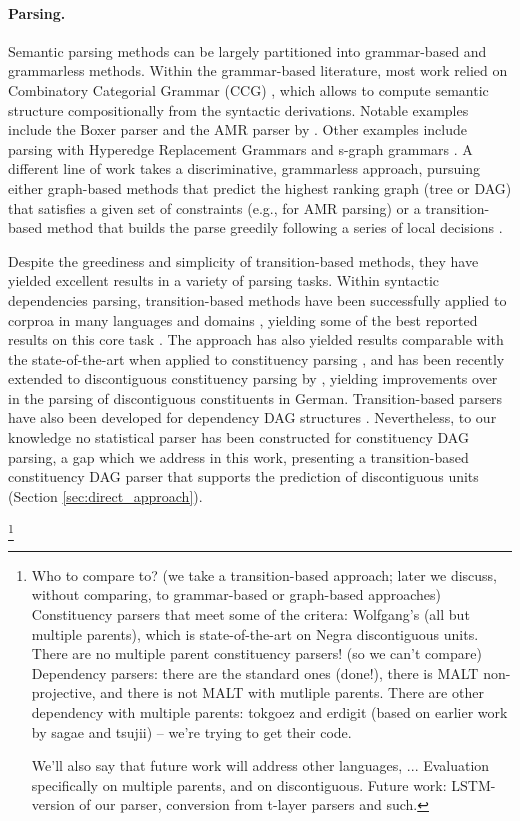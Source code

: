 \documentclass[11pt]{article}
\newcommand{\oa}[1]{\footnote{\color{red} #1}}
\newcommand{\secref}[1]{Section \ref{#1}}
\begin{document}
\paragraph{Parsing.}
Semantic parsing methods can be largely partitioned into grammar-based and grammarless methods.
Within the grammar-based literature, most work relied on Combinatory Categorial Grammar (CCG)
\cite{Steedman:00}, which allows to compute semantic structure compositionally from the
syntactic derivations. Notable examples include the Boxer parser \cite{boxer} and the AMR parser 
by . Other examples include parsing with Hyperedge Replacement Grammars
\cite{jones2012,chiang2013parsing,peng2015synchronous} and s-graph grammars \cite{koller2015semantic}.
A different line of work takes a discriminative, grammarless approach,
pursuing either graph-based methods that predict the highest ranking graph
(tree or DAG) that satisfies a given set of constraints (e.g., 
for AMR parsing)
or a transition-based method that builds the parse greedily following a series of local
decisions \cite{nivre2004}.

Despite the greediness and simplicity of transition-based methods, they have yielded excellent
results in a variety of parsing tasks. Within syntactic dependencies parsing, transition-based methods
have been successfully applied to corproa in many languages and domains \cite{}, yielding some
of the best reported results on this core task \cite{lstm_parser}. 
The approach has also yielded results comparable with the state-of-the-art when applied
to constituency parsing \cite{sagae,zhu}, and has been recently extended to
discontiguous constituency parsing by , yielding improvements over in the parsing of discontiguous constituents in German.
Transition-based parsers have also been developed for dependency DAG structures
\cite{sagae_tsuji_2008,tokgoz2015}. Nevertheless, to our knowledge no statistical parser has
been constructed for constituency DAG parsing, a gap which
we address in this work, presenting a transition-based constituency DAG parser that supports
the prediction of discontiguous units (\secref{sec:direct_approach}). 

\oa{Who to compare to? (we take a transition-based approach; later we discuss,
  without comparing, to grammar-based
  or graph-based approaches)
  Constituency parsers that meet some of the critera: Wolfgang's (all but multiple parents),
        which is state-of-the-art on Negra discontiguous units.
        There are no multiple parent constituency parsers! (so we can't compare)
  Dependency parsers: there are the standard ones (done!), there is MALT non-projective, and there is not MALT with mutliple parents. There are other dependency with multiple parents: tokgoez and erdigit (based on earlier work by sagae and tsujii) -- we're trying to get their code.
  
  We'll also say that future work will address other languages, ...
  Evaluation specifically on multiple parents, and on discontiguous.
  Future work: LSTM-version of our parser, conversion from t-layer parsers and such.
}
\end{document}
